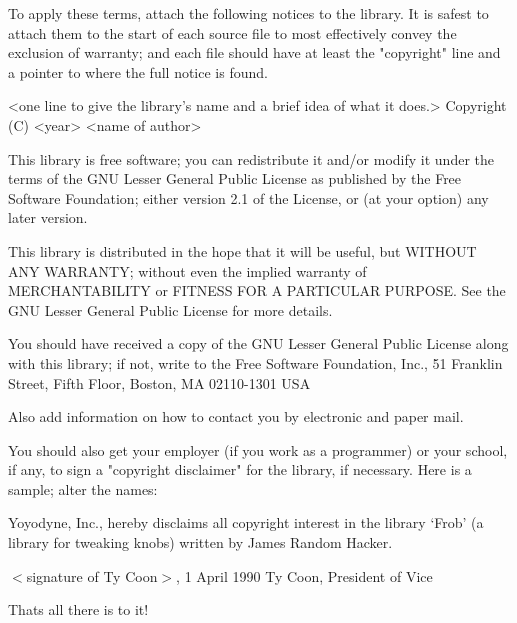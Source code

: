 To apply these terms, attach the following notices to the library. It is safest to attach them to the start of each source file to most effectively convey the exclusion of warranty; and each file should have at least the "{}copyright"{} line and a pointer to where the full notice is found. \begin{DoxyVerb}<one line to give the library's name and a brief idea of what it does.>
Copyright (C) <year>  <name of author>

This library is free software; you can redistribute it and/or
modify it under the terms of the GNU Lesser General Public
License as published by the Free Software Foundation; either
version 2.1 of the License, or (at your option) any later version.

This library is distributed in the hope that it will be useful,
but WITHOUT ANY WARRANTY; without even the implied warranty of
MERCHANTABILITY or FITNESS FOR A PARTICULAR PURPOSE.  See the GNU
Lesser General Public License for more details.

You should have received a copy of the GNU Lesser General Public
License along with this library; if not, write to the Free Software
Foundation, Inc., 51 Franklin Street, Fifth Floor, Boston, MA  02110-1301
USA
\end{DoxyVerb}


Also add information on how to contact you by electronic and paper mail.

You should also get your employer (if you work as a programmer) or your school, if any, to sign a "{}copyright disclaimer"{} for the library, if necessary. Here is a sample; alter the names\+:

Yoyodyne, Inc., hereby disclaims all copyright interest in the library `Frob' (a library for tweaking knobs) written by James Random Hacker.

$<$signature of Ty Coon$>$, 1 April 1990 Ty Coon, President of Vice

That\textquotesingle{}s all there is to it! 